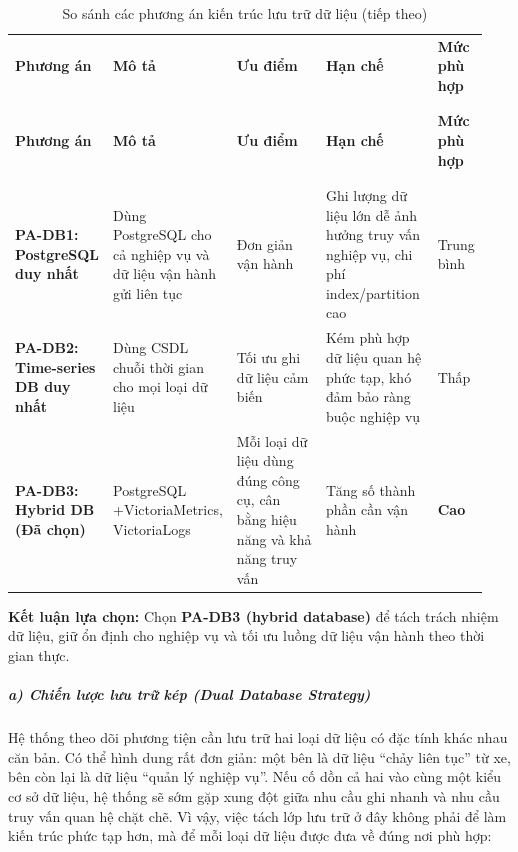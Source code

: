 \documentclass[a4paper]{extarticle}
\newcommand{\thesissettableid}[2]{%
  \renewcommand{\thetable}{#1}%
  \renewcommand{\theHtable}{#2}%
}
\begin{document}
{\thesissettableid{3.18A}{tab-ch3-so-sanh-cac-phuong-an-kien-truc-luu-tru-du-lieu}
\def\LTcaptype{table}
\begin{longtable}{|L{0.149\linewidth}|L{0.233\linewidth}|L{0.236\linewidth}|L{0.241\linewidth}|L{0.085\linewidth}|}
\caption{So sánh các phương án kiến trúc lưu trữ dữ liệu}\label{tab:ch3-so-sanh-cac-phuong-an-kien-truc-luu-tru-du-lieu}\\
\hline \textbf{Phương án} & \textbf{Mô tả} & \textbf{Ưu điểm} & \textbf{Hạn chế} & \textbf{Mức phù hợp} \\
\\\hline
\endfirsthead
\caption[]{So sánh các phương án kiến trúc lưu trữ dữ liệu (tiếp theo)}\\
\hline \textbf{Phương án} & \textbf{Mô tả} & \textbf{Ưu điểm} & \textbf{Hạn chế} & \textbf{Mức phù hợp} \\
\\\hline
\endhead
\\\hline
\endfoot
\endlastfoot
\textbf{PA-DB1: PostgreSQL duy nhất} & Dùng PostgreSQL cho cả nghiệp vụ
và dữ liệu vận hành gửi liên tục & Đơn giản vận hành & Ghi lượng dữ liệu lớn dễ ảnh hưởng truy
vấn nghiệp vụ, chi phí index/partition cao & Trung bình \\\hline
\textbf{PA-DB2: Time-series DB duy nhất} & Dùng CSDL chuỗi thời gian cho
mọi loại dữ liệu & Tối ưu ghi dữ liệu cảm biến & Kém phù hợp dữ liệu
quan hệ phức tạp, khó đảm bảo ràng buộc nghiệp vụ & Thấp \\\hline
\textbf{PA-DB3: Hybrid DB (Đã chọn)} & PostgreSQL +\newline Victoria\-Metrics,\newline
Victoria\-Logs & Mỗi loại dữ liệu dùng đúng công cụ, cân bằng hiệu năng và
khả năng truy vấn & Tăng số thành phần cần vận hành & \textbf{Cao} \\\hline
\end{longtable}
}


\textbf{Kết luận lựa chọn:} Chọn \textbf{PA-DB3 (hybrid database)} để
tách trách nhiệm dữ liệu, giữ ổn định cho nghiệp vụ và tối ưu luồng
dữ liệu vận hành theo thời gian thực.

\subparagraph{a) Chiến lược lưu trữ kép (Dual Database
Strategy)}\label{a-chiux1ebfn-lux1b0ux1ee3c-lux1b0u-trux1eef-kuxe9p-dual-database-strategy}

Hệ thống theo dõi phương tiện cần lưu trữ hai loại dữ liệu có đặc tính
khác nhau căn bản. Có thể hình dung rất đơn giản: một bên là dữ liệu
``chảy liên tục'' từ xe, bên còn lại là dữ liệu ``quản lý nghiệp vụ''.
Nếu cố dồn cả hai vào cùng một kiểu cơ sở dữ liệu, hệ thống sẽ sớm gặp
xung đột giữa nhu cầu ghi nhanh và nhu cầu truy vấn quan hệ chặt chẽ.
Vì vậy, việc tách lớp lưu trữ ở đây không phải để làm kiến trúc phức
tạp hơn, mà để mỗi loại dữ liệu được đưa về đúng nơi phù hợp:
\end{document}
